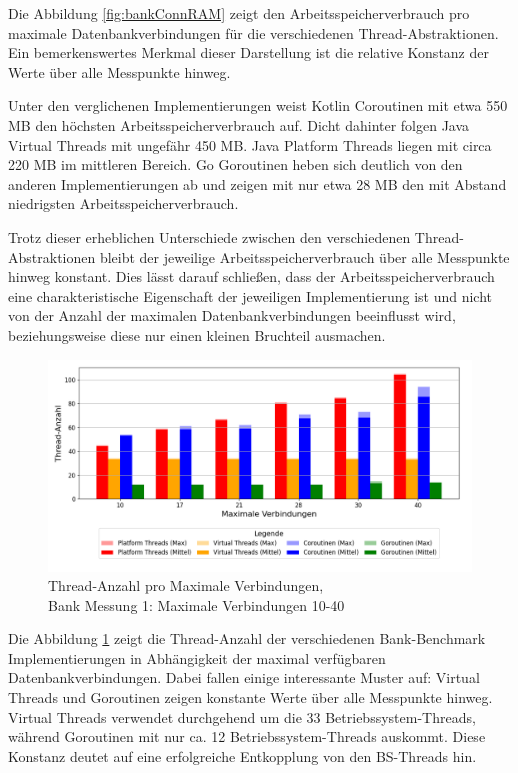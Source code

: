 \documentclass[fontsize=12pt,paper=a4,twoside=semi,parskip=half-,headsepline,headinclude]{scrreprt}
\begin{document}
Die Abbildung \ref{fig:bankConnRAM} zeigt den Arbeitsspeicherverbrauch pro maximale Datenbankverbindungen für die verschiedenen Thread-Abstraktionen. Ein bemerkenswertes Merkmal dieser Darstellung ist die relative Konstanz der Werte über alle Messpunkte hinweg.

Unter den verglichenen Implementierungen weist Kotlin Coroutinen mit etwa 550 MB den höchsten Arbeitsspeicherverbrauch auf. Dicht dahinter folgen Java Virtual Threads mit ungefähr 450 MB. Java Platform Threads liegen mit circa 220 MB im mittleren Bereich. Go Goroutinen heben sich deutlich von den anderen Implementierungen ab und zeigen mit nur etwa 28 MB den mit Abstand niedrigsten Arbeitsspeicherverbrauch.

Trotz dieser erheblichen Unterschiede zwischen den verschiedenen Thread-Abstraktionen bleibt der jeweilige Arbeitsspeicherverbrauch über alle Messpunkte hinweg konstant. Dies lässt darauf schließen, dass der Arbeitsspeicherverbrauch eine charakteristische Eigenschaft der jeweiligen Implementierung ist und nicht von der Anzahl der maximalen Datenbankverbindungen beeinflusst wird, beziehungsweise diese nur einen kleinen Bruchteil ausmachen.

\begin{figure}[H]
	\centering
	\includegraphics[scale=0.5]{figures/bank/connections10-40/num_threads_bar_plot.png}
	\caption{Thread-Anzahl pro Maximale Verbindungen,\\ Bank Messung 1: Maximale Verbindungen 10-40}
	\label{fig:bankConnThreads}
\end{figure}

Die Abbildung \ref{fig:bankConnThreads} zeigt die Thread-Anzahl der verschiedenen Bank-Benchmark Implementierungen in Abhängigkeit der maximal verfügbaren Datenbankverbindungen. Dabei fallen einige interessante Muster auf:
Virtual Threads und Goroutinen zeigen konstante Werte über alle Messpunkte hinweg. Virtual Threads verwendet durchgehend um die 33 Betriebssystem-Threads, während Goroutinen mit nur ca. 12 Betriebssystem-Threads auskommt. Diese Konstanz deutet auf eine erfolgreiche Entkopplung von den BS-Threads hin.
\end{document}

